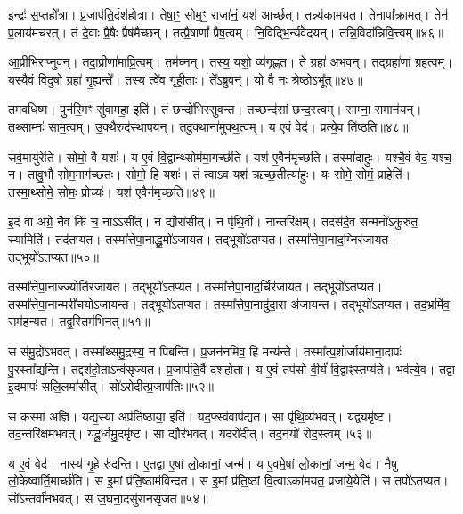 इन्द्रः॑ स॒प्तहो᳚त्रा।
प्र॒जा\-प॑ति॒र्दश॑होत्रा।
तेषा॒ꣳ॒ सोम॒ꣳ॒ राजा॑नं॒ यश॑ आर्च्छत्।
तन्न्य॑कामयत।
तेनापा᳚क्रामत्।
तेन॑ प्र॒लाय॑मचरत्।
तं दे॒वाः प्रै॒षैः प्रैष॑मैच्छन्।
तत्प्रै॒षाणां᳚ प्रैष॒त्वम्।
नि॒विद्भि॒र्न्य॑वेदयन्।
तन्नि॒विदा᳚न्निवि॒त्त्वम्॥४६॥

आ॒प्रीभि॑राप्नुवन्।
तदा॒प्रीणा॑माप्रि॒त्वम्।
तम॑घ्नन्।
तस्य॒ यशो॒ व्य॑गृह्णत।
ते ग्रहा॑ अभवन्।
तद्ग्रहा॑णां ग्रह॒त्वम्।
यस्यै॒वं वि॒दुषो॒ ग्रहा॑ गृ॒ह्यन्ते᳚।
तस्य॒ त्वे॑व गृ॑ही॒ताः।
ते᳚ऽब्रुवन्।
यो वै नः॒ श्रेष्ठो\-ऽभू᳚त्॥४७॥

तम॑वधिष्म।
पुन॑रि॒मꣳ सु॑वामहा॒ इति॑।
तं छन्दो॑भिरसुवन्त।
तच्छन्द॑सां छन्द॒स्त्वम्।
साम्ना॒ समान॑यन्।
तथ्साम्नः॑ साम॒त्वम्।
उ॒क्थैरुद॑स्थापयन्।
तदु॒क्थाना॑मुक्थ॒त्वम्।
य ए॒वं वेद॑।
प्रत्ये॒व ति॑ष्ठति॥४८॥

सर्व॒मायु॑रेति।
सोमो॒ वै यशः॑।
य ए॒वं वि॒द्वान्थ्सोम॑मा॒गच्छ॑ति।
यश॑ ए॒वैन॑मृच्छति।
तस्मा॑दाहुः।
यश्चै॒वं वेद॒ यश्च॒ न।
तावु॒भौ सोम॒माग॑च्छतः।
सोमो॒ हि यशः॑।
तं त्वाऽव यश॑ ऋच्छ॒तीत्या॑हुः।
यः सोमे॒ सोमं॒ प्राहेति॑।
तस्मा॒थ्सोमे॒ सोमः॒ प्रोच्यः॑।
यश॑ ए॒वैन॑मृच्छति॥४९॥

इ॒दं वा अग्रे॒ नैव किं च॒ नाऽऽसी᳚त्।
न द्यौरा॑सीत्।
न पृ॑थि॒वी।
नान्तरि॑क्षम्।
तदस॑दे॒व सन्मनो॑\-ऽकुरुत॒ स्यामिति॑।
तद॑तप्यत।
तस्मा᳚त्तेपा॒नाद्धू॒मो॑\-ऽजायत।
तद्भूयो॑\-ऽतप्यत।
तस्मा᳚त्तेपा॒ना\-द॒ग्निर॑जायत।
तद्भूयो॑\-ऽतप्यत॥५०॥

तस्मा᳚त्तेपा॒नाज्ज्योति॑रजायत।
तद्भूयो॑\-ऽतप्यत।
तस्मा᳚त्तेपा॒ना\-द॒र्चिर॑जायत।
तद्भूयो॑\-ऽतप्यत।
तस्मा᳚त्तेपा॒नान्मरी॑चयो\-ऽजायन्त।
तद्भूयो॑\-ऽतप्यत।
तस्मा᳚त्तेपा॒नादु॑दा॒रा अ॑जायन्त।
तद्भूयो॑\-ऽतप्यत।
तद॒भ्रमि॑व॒ सम॑हन्यत।
तद्व॒स्तिम॑भिनत्॥५१॥

स स॑मु॒द्रो॑\-ऽभवत्।
तस्मा᳚थ्समु॒द्रस्य॒ न पि॑बन्ति।
प्र॒जन॑नमिव॒ हि मन्य॑न्ते।
तस्मा᳚त्प॒शोर्जाय॑माना॒दापः॑ पु॒रस्ता᳚द्यन्ति।
तद्दश॑हो॒ता\-ऽन्व॑सृज्यत।
प्र॒जा\-प॑ति॒र्वै दश॑होता।
य ए॒वं तप॑सो वी॒र्यं॑ वि॒द्वाꣴस्तप्य॑ते।
भव॑त्ये॒व।
तद्वा इ॒दमापः॑ सलि॒लमा॑सीत्।
सो॑ऽरोदीत्प्र॒जा\-प॑तिः॥५२॥

स कस्मा॑ अज्ञि।
यद्य॒स्या अप्र॑तिष्ठाया॒ इति॑।
यद॒फ्स्व॑वाप॑द्यत।
सा पृ॑थि॒व्य॑भवत्।
यद्व्यमृ॑ष्ट।
तद॒न्तरि॑क्षम\-भवत्।
यदू॒र्ध्वमु॒दमृ॑ष्ट।
सा द्यौर॑भवत्।
यदरो॑दीत्।
तद॒नयो॑ रोद॒स्त्वम्॥५३॥

य ए॒वं वेद॑।
नास्य॑ गृ॒हे रु॑दन्ति।
ए॒तद्वा ए॒षां लो॒कानां॒ जन्म॑।
य ए॒वमे॒षां लो॒कानां॒ जन्म॒ वेद॑।
नैषु लो॒केष्वार्ति॒मार्च्छ॑ति।
स इ॒मां प्र॑ति॒ष्ठाम॑विन्दत।
स इ॒मां प्र॑ति॒ष्ठां वि॒त्वा\-ऽका॑मयत॒ प्रजा॑ये॒येति॑।
स तपो॑\-ऽतप्यत।
सो᳚ऽन्तर्वा॑नभवत्।
स ज॒घना॒दसु॑रान\-सृजत॥५४॥


